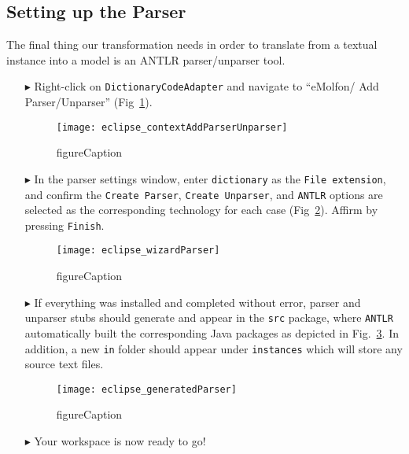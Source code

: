 \newpage
\hypertarget{subSec:setupParser}{}
\subsection{Setting up the Parser}
\genHeader

The final thing our transformation needs in order to translate from a textual instance into a model is an ANTLR parser/unparser tool.

\begin{itemize}

\item[$\blacktriangleright$] Right-click on \texttt{DictionaryCodeAdapter} and navigate to ``eMolfon/ Add Parser/Unparser''
(Fig~\ref{eclipse:contextParser}).

\vspace{0.5cm}

\begin{figure}[htpb]
\begin{center}
  \texttt{[image: eclipse\_contextAddParserUnparser]}
  \caption{figureCaption}
  \label{eclipse:contextParser}
\end{center}
\end{figure}


\item[$\blacktriangleright$] In the parser settings window, enter \texttt{dictionary} as the \texttt{File extension}, and confirm the \texttt{Create Parser},
\texttt{Create Unparser}, and \texttt{ANTLR} options are selected as the corresponding technology for each case (Fig~\ref{eclipse:wizardParser}). Affirm by
pressing \texttt{Finish}.

\begin{figure}[htpb]
\begin{center}
  \texttt{[image: eclipse\_wizardParser]}
  \caption{figureCaption}
  \label{eclipse:wizardParser}
\end{center}
\end{figure}

\vspace{0.5cm}

\item[$\blacktriangleright$] If everything was installed and completed without error, parser and unparser stubs should generate and appear in the \texttt{src}
package, where \texttt{ANTLR} automatically built the corresponding Java packages as depicted in Fig.~\ref{eclipse:generatedParser}. In addition, a new
\texttt{in} folder should appear under \texttt{instances} which will store any source text files.

\begin{figure}[htpb]
\begin{center}
  \texttt{[image: eclipse\_generatedParser]}
  \caption{figureCaption}
  \label{eclipse:generatedParser}
\end{center}
\end{figure}

\vspace{0.5cm}

\item[$\blacktriangleright$] Your workspace is now ready to go!

\end{itemize}
